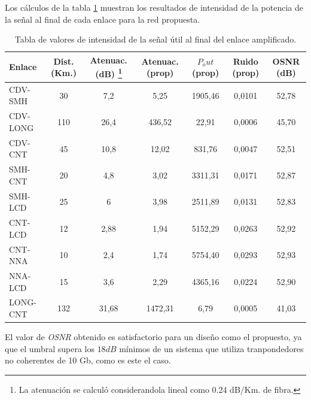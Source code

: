 Los cálculos de la tabla \ref{tab:osnr1} muestran los resultados de
intensidad de la potencia de la señal al final de cada enlace para
la red propuesta.

\begin{table}[H]
  \centering
  \begin{tabular}{| l | c | c | c | c | c | c |}
    \hline{}
    Enlace & Dist. (Km.) & Atenuac. (dB) \footnote{La atenuación se calculó considerandola lineal como 0.24 dB/Km. de fibra.} & Atenuac. (prop) & $P_out$ (prop) & Ruido (prop) & OSNR (dB) \\
    \hline{}
    CDV-SMH & 30 & 7,2 & 5,25 & 1905,46 & 0,0101 & 52,78 \\
    CDV-LONG & 110 & 26,4 & 436,52 & 22,91 & 0,0006 & 45,70 \\
    CDV-CNT & 45 & 10,8 & 12,02 & 831,76 & 0,0047 & 52,51 \\
    SMH-CNT & 20 & 4,8 & 3,02 & 3311,31 & 0,0171 & 52,87 \\
    SMH-LCD & 25 & 6 & 3,98 & 2511,89 & 0,0131 & 52,83 \\
    CNT-LCD & 12 & 2,88 & 1,94 & 5152,29 & 0,0263 & 52,92 \\
    CNT-NNA & 10 & 2,4 & 1,74 & 5754,40 & 0,0293 & 52,93 \\
    NNA-LCD & 15 & 3,6 & 2,29 & 4365,16 & 0,0224 & 52,90 \\
    LONG-CNT & 132 & 31,68 & 1472,31 & 6,79 & 0,0005 & 41,03 \\
    \hline
  \end{tabular}
  \caption{Tabla de valores de intensidad de la señal útil al final del enlace amplificado.}
  \label{tab:osnr1}
\end{table}

El valor de \emph{OSNR} obtenido es satisfactorio para un diseño como
el propuesto, ya que el umbral supera los $18dB$ mínimos de un sistema
que utiliza tranpondedores no coherentes de 10 Gb, como es este el
caso.
